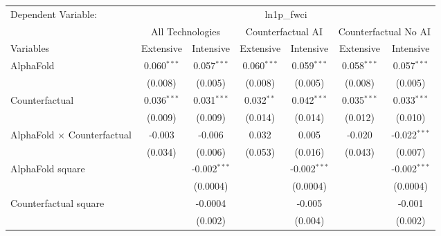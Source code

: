 \begingroup
\centering
\begin{tabular}{lcccccc}
   \tabularnewline \midrule \midrule
   Dependent Variable: & \multicolumn{6}{c}{ln1p\_fwci}\\
 & \multicolumn{2}{c}{All Technologies} & \multicolumn{2}{c}{Counterfactual AI} & \multicolumn{2}{c}{Counterfactual No AI} \\
\cmidrule(lr){1-1}\cmidrule(lr){2-3} \cmidrule(lr){4-5} \cmidrule(lr){6-7}
Variables & \multicolumn{1}{c}{Extensive} & \multicolumn{1}{c}{Intensive} & \multicolumn{1}{c}{Extensive} & \multicolumn{1}{c}{Intensive} & \multicolumn{1}{c}{Extensive} & \multicolumn{1}{c}{Intensive} \\
\cmidrule(lr){1-1}\cmidrule(lr){2-2} \cmidrule(lr){3-3} \cmidrule(lr){4-4} \cmidrule(lr){5-5} \cmidrule(lr){6-6} \cmidrule(lr){7-7}
   AlphaFold                          & 0.060$^{***}$ & 0.057$^{***}$  & 0.060$^{***}$ & 0.059$^{***}$  & 0.058$^{***}$ & 0.057$^{***}$\\   
                                      & (0.008)       & (0.005)        & (0.008)       & (0.005)        & (0.008)       & (0.005)\\   
   Counterfactual                     & 0.036$^{***}$ & 0.031$^{***}$  & 0.032$^{**}$  & 0.042$^{***}$  & 0.035$^{***}$ & 0.033$^{***}$\\   
                                      & (0.009)       & (0.009)        & (0.014)       & (0.014)        & (0.012)       & (0.010)\\   
   AlphaFold $\times$ Counterfactual  & -0.003        & -0.006         & 0.032         & 0.005          & -0.020        & -0.022$^{***}$\\   
                                      & (0.034)       & (0.006)        & (0.053)       & (0.016)        & (0.043)       & (0.007)\\   
   AlphaFold square                   &               & -0.002$^{***}$ &               & -0.002$^{***}$ &               & -0.002$^{***}$\\   
                                      &               & (0.0004)       &               & (0.0004)       &               & (0.0004)\\   
   Counterfactual square              &               & -0.0004        &               & -0.005         &               & -0.001\\   
                                      &               & (0.002)        &               & (0.004)        &               & (0.002)\\   

\end{tabular}
